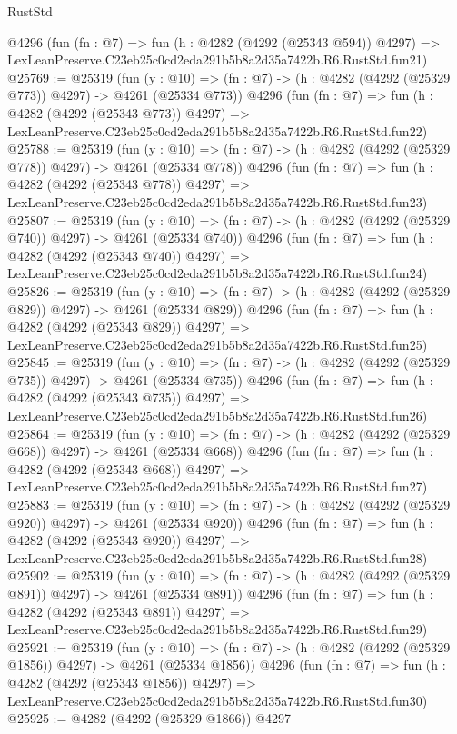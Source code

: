 \begin{lexlean}{RustStd}
\begin{coremodule}
    @4296
    (fun (fn : @7) =>
    fun (h : @4282 (@4292 (@25343 @594)) @4297) =>
    LexLeanPreserve.C23eb25c0cd2eda291b5b8a2d35a7422b.R6.RustStd.fun21)
@25769 := @25319
    (fun (y : @10) => (fn : @7) -> (h : @4282 (@4292 (@25329 @773)) @4297) -> @4261 (@25334 @773))
    @4296
    (fun (fn : @7) =>
    fun (h : @4282 (@4292 (@25343 @773)) @4297) =>
    LexLeanPreserve.C23eb25c0cd2eda291b5b8a2d35a7422b.R6.RustStd.fun22)
@25788 := @25319
    (fun (y : @10) => (fn : @7) -> (h : @4282 (@4292 (@25329 @778)) @4297) -> @4261 (@25334 @778))
    @4296
    (fun (fn : @7) =>
    fun (h : @4282 (@4292 (@25343 @778)) @4297) =>
    LexLeanPreserve.C23eb25c0cd2eda291b5b8a2d35a7422b.R6.RustStd.fun23)
@25807 := @25319
    (fun (y : @10) => (fn : @7) -> (h : @4282 (@4292 (@25329 @740)) @4297) -> @4261 (@25334 @740))
    @4296
    (fun (fn : @7) =>
    fun (h : @4282 (@4292 (@25343 @740)) @4297) =>
    LexLeanPreserve.C23eb25c0cd2eda291b5b8a2d35a7422b.R6.RustStd.fun24)
@25826 := @25319
    (fun (y : @10) => (fn : @7) -> (h : @4282 (@4292 (@25329 @829)) @4297) -> @4261 (@25334 @829))
    @4296
    (fun (fn : @7) =>
    fun (h : @4282 (@4292 (@25343 @829)) @4297) =>
    LexLeanPreserve.C23eb25c0cd2eda291b5b8a2d35a7422b.R6.RustStd.fun25)
@25845 := @25319
    (fun (y : @10) => (fn : @7) -> (h : @4282 (@4292 (@25329 @735)) @4297) -> @4261 (@25334 @735))
    @4296
    (fun (fn : @7) =>
    fun (h : @4282 (@4292 (@25343 @735)) @4297) =>
    LexLeanPreserve.C23eb25c0cd2eda291b5b8a2d35a7422b.R6.RustStd.fun26)
@25864 := @25319
    (fun (y : @10) => (fn : @7) -> (h : @4282 (@4292 (@25329 @668)) @4297) -> @4261 (@25334 @668))
    @4296
    (fun (fn : @7) =>
    fun (h : @4282 (@4292 (@25343 @668)) @4297) =>
    LexLeanPreserve.C23eb25c0cd2eda291b5b8a2d35a7422b.R6.RustStd.fun27)
@25883 := @25319
    (fun (y : @10) => (fn : @7) -> (h : @4282 (@4292 (@25329 @920)) @4297) -> @4261 (@25334 @920))
    @4296
    (fun (fn : @7) =>
    fun (h : @4282 (@4292 (@25343 @920)) @4297) =>
    LexLeanPreserve.C23eb25c0cd2eda291b5b8a2d35a7422b.R6.RustStd.fun28)
@25902 := @25319
    (fun (y : @10) => (fn : @7) -> (h : @4282 (@4292 (@25329 @891)) @4297) -> @4261 (@25334 @891))
    @4296
    (fun (fn : @7) =>
    fun (h : @4282 (@4292 (@25343 @891)) @4297) =>
    LexLeanPreserve.C23eb25c0cd2eda291b5b8a2d35a7422b.R6.RustStd.fun29)
@25921 := @25319
    (fun (y : @10) => (fn : @7) -> (h : @4282 (@4292 (@25329 @1856)) @4297) -> @4261 (@25334 @1856))
    @4296
    (fun (fn : @7) =>
    fun (h : @4282 (@4292 (@25343 @1856)) @4297) =>
    LexLeanPreserve.C23eb25c0cd2eda291b5b8a2d35a7422b.R6.RustStd.fun30)
@25925 := @4282 (@4292 (@25329 @1866)) @4297

\end{coremodule}
\end{lexlean}
